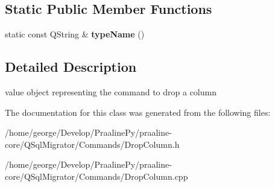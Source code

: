 \subsection*{Static Public Member Functions}
\begin{DoxyCompactItemize}
\item 
\mbox{\label{class_q_sql_migrator_1_1_commands_1_1_drop_column_a644ce32a7e8893fcb0013fef2c92cfe1}} 
static const Q\+String \& {\bfseries type\+Name} ()
\end{DoxyCompactItemize}


\subsection{Detailed Description}
value object representing the command to drop a column 

The documentation for this class was generated from the following files\+:\begin{DoxyCompactItemize}
\item 
/home/george/\+Develop/\+Praaline\+Py/praaline-\/core/\+Q\+Sql\+Migrator/\+Commands/Drop\+Column.\+h\item 
/home/george/\+Develop/\+Praaline\+Py/praaline-\/core/\+Q\+Sql\+Migrator/\+Commands/Drop\+Column.\+cpp\end{DoxyCompactItemize}
